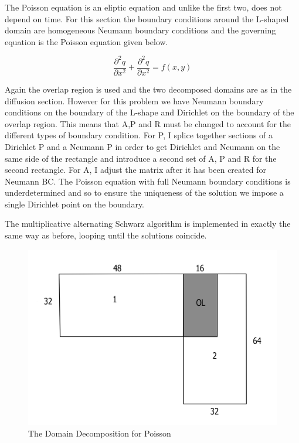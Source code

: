 \documentclass[11pt,a4paper,notitlepage]{article}
\begin{document}
The Poisson equation is an eliptic equation and unlike the first two, does not depend on time. For this section the boundary conditions around the L-shaped domain are homogeneous Neumann boundary conditions and the governing equation is the Poisson equation given below.

\begin{equation}
\frac{\partial^2 q}{\partial x^2} + \frac{\partial^2 q}{\partial x^2} = f\left(x,y\right)
\end{equation} 

Again the overlap region is used and the two decomposed domains are as in the diffusion section. However for this problem we have Neumann boundary conditions on the boundary of the L-shape and Dirichlet on the boundary of the overlap region. This means that A,P and R must be changed to account for the different types of boundary condition. For P, I splice together sections of a Dirichlet P and a Neumann P in order to get Dirichlet and Neumann on the same side of the rectangle and introduce a second set of A, P and R for the second rectangle. For A, I adjust the matrix after it has been created for Neumann BC. The Poisson equation with full Neumann boundary conditions is underdetermined and so to ensure the uniqueness of the solution we impose a single Dirichlet point on the boundary.

The multiplicative alternating Schwarz algorithm is implemented in exactly the same way as before, looping until the solutions coincide.

\begin{figure}[h]
\vspace{-10pt}
\includegraphics[width=.9\linewidth]{LShapeDomain2.jpeg}
\vspace{-20pt}
\caption{The Domain Decomposition for Poisson}
\label{poisson.decomp}
\end{figure}
\end{document}
